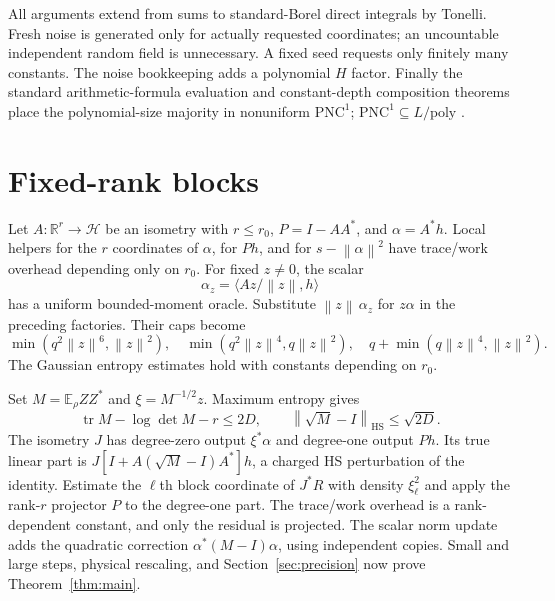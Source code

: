 \documentclass[11pt]{article}
\newcommand{\E}{\mathbb E}
\newcommand{\R}{\mathbb R}
\newcommand{\norm}[1]{\left\lVert #1\right\rVert}
\newcommand{\HS}{\mathrm{HS}}
\newcommand{\PNC}{\mathrm{PNC}^{1}}
\begin{document}
All arguments extend from sums to standard-Borel direct integrals by Tonelli. Fresh noise is generated only for actually requested coordinates; an uncountable independent random field is unnecessary. A fixed seed requests only finitely many constants. The noise bookkeeping adds a polynomial $H$ factor. Finally the standard arithmetic-formula evaluation and constant-depth composition theorems place the polynomial-size majority in nonuniform $\PNC$; $\PNC\subseteq L/\mathrm{poly}$ \cite{datta}.

\section{Fixed-rank blocks}
\label{sec:block}
Let $A:\R^r\to\mathcal H$ be an isometry with $r\le r_0$, $P=I-AA^*$, and $\alpha=A^*h$. Local helpers for the $r$ coordinates of $\alpha$, for $Ph$, and for $s-\norm\alpha^2$ have trace/work overhead depending only on $r_0$. For fixed $z\ne0$, the scalar
\[
 \alpha_z=\langle Az/\norm z,h\rangle
\]
has a uniform bounded-moment oracle. Substitute $\norm z\,\alpha_z$ for $z\alpha$ in the preceding factories. Their caps become
\[
 \min(q^2\norm z^6,\norm z^2),\quad
 \min(q^2\norm z^4,q\norm z^2),\quad
 q+\min(q\norm z^4,\norm z^2).
\]
The Gaussian entropy estimates hold with constants depending on $r_0$.

Set $M=\E_\rho ZZ^*$ and $\xi=M^{-1/2}z$. Maximum entropy gives
\[
 \operatorname{tr}M-\log\det M-r\le2D,\qquad
 \norm{\sqrt M-I}_{\HS}\le\sqrt{2D}.
\]
The isometry $J$ has degree-zero output $\xi^*\alpha$ and degree-one output $Ph$. Its true linear part is $J[I+A(\sqrt M-I)A^*]h$, a charged HS perturbation of the identity. Estimate the $\ell$th block coordinate of $J^*R$ with density $\xi_\ell^2$ and apply the rank-$r$ projector $P$ to the degree-one part. The trace/work overhead is a rank-dependent constant, and only the residual is projected. The scalar norm update adds the quadratic correction $\alpha^*(M-I)\alpha$, using independent copies. Small and large steps, physical rescaling, and Section~\ref{sec:precision} now prove Theorem~\ref{thm:main}.
\end{document}

